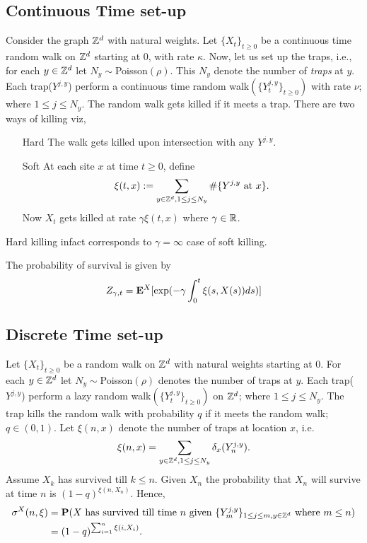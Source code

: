 \documentclass[main]{subfiles}
\begin{document}
\subsection*{Continuous Time set-up}
Consider the graph $\mathbb Z^d$ with natural weights. Let $\{X_t\}_{t\geq 0}$ be a continuous time random walk on $\mathbb Z^d$ starting at 0, with rate $\kappa$. Now, let us set up the traps, i.e., for each $y\in \mathbb Z^d$ let $N_y\sim$Poisson$(\rho)$. This $N_y$ denote the number of \textit{traps} at $y$. Each trap($Y^{j,y}$) perform a continuous time random walk$(\{Y^{j,y}_t\}_{t\geq 0})$ with rate $\nu$; where $1\leq j \leq N_y$. The random walk gets killed if it meets a trap. There are two ways of killing viz,
\begin{itemize}
    \item [Hard] The walk gets killed upon intersection with any $Y^{j,y}$.
    \item [Soft] At each site $x$ at time $t\geq 0$, define
          $$
              \xi(t,x):=\sum_{y \in \mathbb Z^d,1\leq j \leq N_y} \# \{Y^{j,y}\text{ at }x\}.
          $$
          Now $X_t$ gets killed at rate $\gamma\xi(t,x)$ where $\gamma \in \mathbb R$.
\end{itemize}
\begin{remark}
    Hard killing infact corresponds to $\gamma=\infty$ case of soft killing.
\end{remark}
The probability of survival is given by
\begin{equation*}
    Z_{\gamma,t}=\mathbf E^X[\exp(-\gamma\int_{0}^{t}\xi(s,X(s))ds)]
\end{equation*}
\subsection*{Discrete Time set-up}
Let $\{X_t\}_{t\geq 0}$ be a random walk on $\mathbb Z^d$ with natural weights starting at 0. For each $y\in \mathbb Z^d$ let $N_y\sim$Poisson$(\rho)$ denotes the number of traps at $y$. Each trap($Y^{j,y}$) perform a lazy random walk$(\{Y^{j,y}_t\}_{t\geq 0})$ on $\mathbb Z^d$; where $1\leq j \leq N_y$. The trap kills the random walk with probability $q$ if it meets the random walk; $q \in (0,1)$.
Let $\xi(n,x)$ denote the number of traps at location $x$, i.e.
$$
    \xi(n,x)=\sum_{y \in \mathbb Z^d,1\leq j \leq N_y} \delta_x(Y^{j,y}_n).
$$
Assume $X_k$ has survived till $k\leq n$. Given $X_n$ the probability that $X_n$ will survive at time $n$ is $(1-q)^{\xi(n,X_n)}$.
Hence,
\begin{equation}
    \begin{aligned}
        \sigma^X(n,\xi) & =\mathbf P(X\text{ has survived till time } n \text{ given } \{Y^{j,y}_m\}_{1\leq j \leq m, y \in \mathbb Z^d} \text{ where } m\leq n) \\
                        & =(1-q)^{\sum_{i=1}^{n}\xi(i,X_i)}.
    \end{aligned}
\end{equation}
\end{document}

